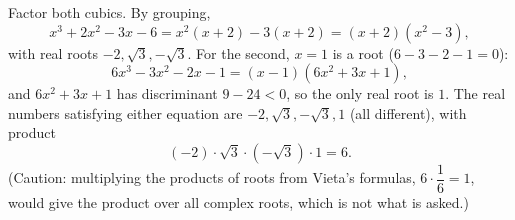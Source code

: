 Factor both cubics. By grouping,
\[x^3+2x^2-3x-6=x^2(x+2)-3(x+2)=(x+2)(x^2-3),\]
with real roots $-2,\sqrt3,-\sqrt3$. For the second, $x=1$ is a root ($6-3-2-1=0$):
\[6x^3-3x^2-2x-1=(x-1)(6x^2+3x+1),\]
and $6x^2+3x+1$ has discriminant $9-24<0$, so the only real root is $1$. The real numbers satisfying either equation are $-2,\sqrt3,-\sqrt3,1$ (all different), with product
\[(-2)\cdot\sqrt3\cdot\left(-\sqrt3\right)\cdot1=\boxed{6}.\]
(Caution: multiplying the products of roots from Vieta's formulas, $6\cdot\dfrac{1}{6}=1$, would give the product over all complex roots, which is not what is asked.)
